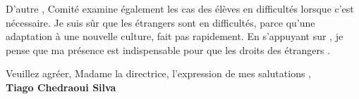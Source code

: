 \documentclass[11pt]{article}
\newcommand{\red}[1]{{\color{red}{#1}}}
\begin{document}
 D'autre  \red{part}, \red{ce}  Comité  examine  également les  cas  des élèves  en
 difficultés lorsque  c'est nécessaire.  Je suis sûr  que les étrangers  sont en
 difficultés, parce qu'une  adaptation à une nouvelle culture,  \red{ne se} fait
 pas  rapidement. En  s'appuyant sur  \red{ce fait},  je pense  que  ma présence
 est indispensable pour que les droits des étrangers \red{soient respectés}.

Veuillez agréer, Madame la directrice, l'expression de mes salutations \red{distinguées},\\[2em]

%
{\bfseries Tiago Chedraoui Silva}\\
%
\vfill%
\end{document}
